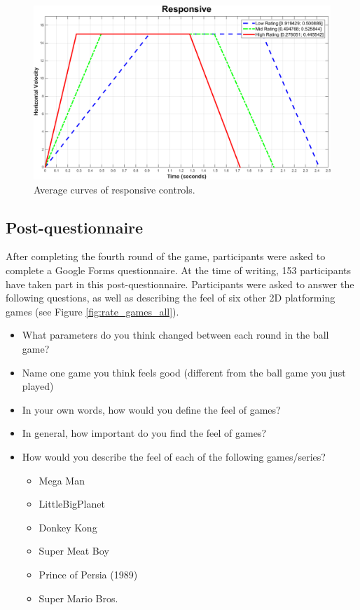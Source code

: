 \begin{figure}[htbp]
\centering
\includegraphics[width=0.9\columnwidth]{Pics/Curves/Responsive_curve}
\caption{Average curves of responsive controls.}
\label{fig:curve_responsive}
\end{figure}

\subsection{Post-questionnaire}
After completing the fourth round of the game, participants were asked to complete a Google Forms questionnaire. At the time of writing, 153 participants have taken part in this post-questionnaire. Participants were asked to answer the following questions, as well as describing the feel of six other 2D platforming games (see Figure \ref{fig:rate_games_all}).
\begin{itemize}[noitemsep,nolistsep]
\item What parameters do you think changed between each round in the ball game?
\item Name one game you think feels good (different from the ball game you just played)
\item In your own words, how would you define the feel of games?
\item In general, how important do you find the feel of games?
\item How would you describe the feel of each of the following games/series?
\begin{itemize}[noitemsep,nolistsep]
\item Mega Man
\item LittleBigPlanet
\item Donkey Kong
\item Super Meat Boy
\item Prince of Persia (1989)
\item Super Mario Bros.
\end{itemize}
\end{itemize}

